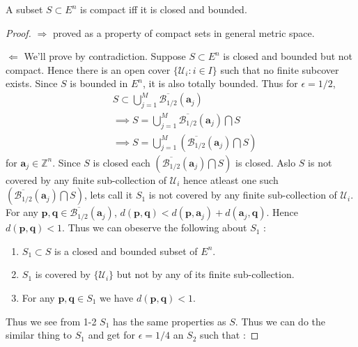 \begin{Theorem}[name=Hiene Borel]
    A subset $S \subset E^n$ is compact iff it is closed and bounded.
\end{Theorem}
\begin{proof}
    $\Rightarrow$ proved as a property of compact sets in general metric space. 

    $\Leftarrow$
	We'll prove by contradiction. Suppose $S \subset E^n$ is closed and bounded but not compact.
	Hence there is an open cover $\left.\lbrace \mathcal{U}_i : i \in I \rbrace\right.$ such
	that no finite subcover exists. Since $S$ is bounded in $E^n$, it is also totally bounded.
	Thus for $\epsilon = 1/2$,
	\begin{displaymath}
	    \begin{aligned}
		& S \subset \bigcup_{j = 1}^M \overline{\mathcal{B}_{1/2}}(\mathbf{a}_j) \\
		& \implies S = \bigcup_{j = 1}^M \overline{\mathcal{B}_{1/2}}(\mathbf{a}_j) 
		\bigcap S \\
		& \implies S = \bigcup_{j = 1}^M \left(\overline{\mathcal{B}_{1/2}}(\mathbf{a}_j) 
		    \bigcap S\right)
	    \end{aligned}
	\end{displaymath}
	for $\mathbf{a}_j \in \mathbb{Z}^n$. Since $S$ is closed each $\left(\overline{\mathcal{B}_{1/2}}
	    (\mathbf{a}_j) \bigcap S\right)$ is closed. Aslo $S$ is not covered by any finite
	sub-collection of $\mathcal{U}_i$ hence atleast one such $\left(\overline{\mathcal{B}_{1/2}}
	    (\mathbf{a}_j) \bigcap S\right)$, lets call it $S_1$ is not covered by any finite
	sub-collection of $\mathcal{U}_i$. For any $\mathbf{p},\mathbf{q} \in \overline{\mathcal{B}_{1/2}}
	(\mathbf{a}_j)$, $d(\mathbf{p},\mathbf{q}) < d(\mathbf{p},\mathbf{a}_j) +
	d(\mathbf{a}_j, \mathbf{q})$. Hence $d(\mathbf{p},\mathbf{q}) < 1$. Thus we can obeserve
	the following about $S_1$ :
	\begin{enumerate}
	    \item $S_1 \subset S$ is a closed and bounded subset of $E^n$.
	    \item $S_1$ is covered by $\left.\lbrace\mathcal{U}_i\rbrace\right.$ but not by any of 
		its finite sub-collection.
	    \item For any $\mathbf{p},\mathbf{q} \in S_1$ we have $d(\mathbf{p},\mathbf{q}) < 1$.
	\end{enumerate}

	Thus we see from 1-2 $S_1$ has the same properties as $S$. Thus we can do the similar thing
	to $S_1$ and get for $\epsilon = 1/4$ an $S_2$ such that :


\end{proof}
